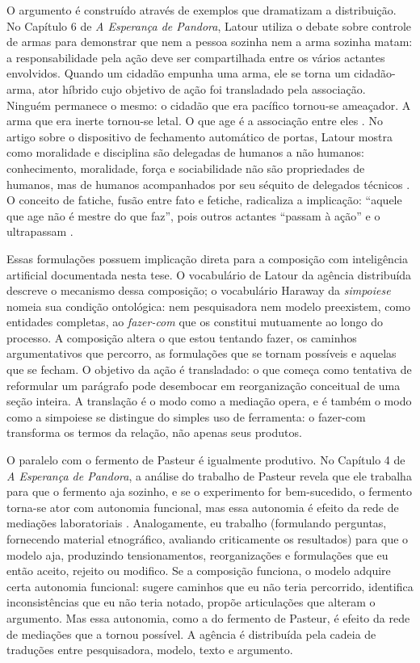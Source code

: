 O argumento é construído através de exemplos que dramatizam a distribuição. No Capítulo 6 de \textit{A Esperança de Pandora}, Latour utiliza o debate sobre controle de armas para demonstrar que nem a pessoa sozinha nem a arma sozinha matam: a responsabilidade pela ação deve ser compartilhada entre os vários actantes envolvidos. Quando um cidadão empunha uma arma, ele se torna um cidadão-arma, ator híbrido cujo objetivo de ação foi transladado pela associação. Ninguém permanece o mesmo: o cidadão que era pacífico tornou-se ameaçador. A arma que era inerte tornou-se letal. O que age é a associação entre eles \parencite{Latour2017Esperanca}. No artigo sobre o dispositivo de fechamento automático de portas, Latour mostra como moralidade e disciplina são delegadas de humanos a não humanos: conhecimento, moralidade, força e sociabilidade não são propriedades de humanos, mas de humanos acompanhados por seu séquito de delegados técnicos \parencite{johnson1988mixing}. O conceito de fatiche, fusão entre fato e fetiche, radicaliza a implicação: ``aquele que age não é mestre do que faz'', pois outros actantes ``passam à ação'' e o ultrapassam \parencite{latour2010factish}.

Essas formulações possuem implicação direta para a composição com inteligência artificial documentada nesta tese. O vocabulário de Latour da agência distribuída descreve o mecanismo dessa composição; o vocabulário Haraway da \textit{simpoiese} nomeia sua condição ontológica: nem pesquisadora nem modelo preexistem, como entidades completas, ao \textit{fazer-com} que os constitui mutuamente ao longo do processo. A composição altera o que estou tentando fazer, os caminhos argumentativos que percorro, as formulações que se tornam possíveis e aquelas que se fecham. O objetivo da ação é transladado: o que começa como tentativa de reformular um parágrafo pode desembocar em reorganização conceitual de uma seção inteira. A translação é o modo como a mediação opera, e é também o modo como a simpoiese se distingue do simples uso de ferramenta: o fazer-com transforma os termos da relação, não apenas seus produtos.

O paralelo com o fermento de Pasteur é igualmente produtivo. No Capítulo 4 de \textit{A Esperança de Pandora}, a análise do trabalho de Pasteur revela que ele trabalha para que o fermento aja sozinho, e se o experimento for bem-sucedido, o fermento torna-se ator com autonomia funcional, mas essa autonomia é efeito da rede de mediações laboratoriais \parencite{Latour2017Esperanca}. Analogamente, eu trabalho (formulando perguntas, fornecendo material etnográfico, avaliando criticamente os resultados) para que o modelo aja, produzindo tensionamentos, reorganizações e formulações que eu então aceito, rejeito ou modifico. Se a composição funciona, o modelo adquire certa autonomia funcional: sugere caminhos que eu não teria percorrido, identifica inconsistências que eu não teria notado, propõe articulações que alteram o argumento. Mas essa autonomia, como a do fermento de Pasteur, é efeito da rede de mediações que a tornou possível. A agência é distribuída pela cadeia de traduções entre pesquisadora, modelo, texto e argumento.


